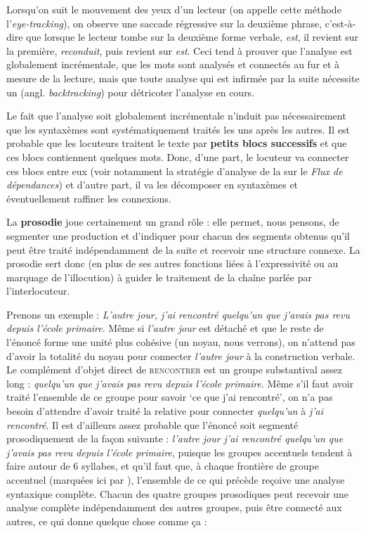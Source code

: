 {    Lorsqu’on suit le mouvement des yeux d’un lecteur (on appelle cette méthode l’\textit{eye-tracking}), on observe une saccade régressive sur la deuxième phrase, c’est-à-dire que lorsque le lecteur tombe sur la deuxième forme verbale, \textit{est}, il revient sur la première, \textit{reconduit}, puis revient sur \textit{est}. Ceci tend à prouver que l’analyse est globalement incrémentale, que les mots sont analysés et connectés au fur et à mesure de la lecture, mais que toute analyse qui est infirmée par la suite nécessite un  (angl. \textit{backtracking}) pour détricoter l’analyse en cours.

    Le fait que l’analyse soit globalement incrémentale n’induit pas nécessairement que les syntaxèmes sont systématiquement traités les uns après les autres. Il est probable que les locuteurs traitent le texte par \textbf{petits blocs successifs} et que ces blocs contiennent quelques mots. Donc, d’une part, le locuteur va connecter ces blocs entre eux (voir notamment la stratégie d’analyse de la  sur le \textit{Flux de dépendances}) et d’autre part, il va les décomposer en syntaxèmes et éventuellement raffiner les connexions.

    La \textbf{prosodie} joue certainement un grand rôle : elle permet, nous pensons, de segmenter une production et d’indiquer pour chacun des segments obtenus qu’il peut être traité indépendamment de la suite et recevoir une structure connexe. La prosodie sert donc (en plus de ses autres fonctions liées à l’expressivité ou au marquage de l’illocution) à guider le traitement de la chaîne parlée par l’interlocuteur.

    Prenons un exemple : \textit{L’autre jour, j’ai rencontré quelqu’un que j’avais pas revu depuis l’école primaire}. Même si \textit{l’autre jour} est détaché et que le reste de l’énoncé forme une unité plus cohésive (un noyau, nous verrons), on n’attend pas d’avoir la totalité du noyau pour connecter \textit{l’autre jour} à la construction verbale. Le complément d’objet direct de \textsc{rencontrer} est un groupe substantival assez long : \textit{quelqu’un que j’avais pas revu depuis l’école primaire}. Même s’il faut avoir traité l’ensemble de ce groupe pour savoir ‘ce que j’ai rencontré’, on n’a pas besoin d’attendre d’avoir traité la relative pour connecter \textit{quelqu’un} à \textit{j’ai rencontré}. Il est d’ailleurs assez probable que l’énoncé soit segmenté prosodiquement de la façon suivante : \textit{l’autre jour {\textbar} j’ai rencontré quelqu’un {\textbar} que j’avais pas revu {\textbar} depuis l’école primaire}, puisque les groupes accentuels tendent à faire autour de 6 syllabes, et qu’il faut que, à chaque frontière de groupe accentuel (marquées ici par {\textbar} ), l’ensemble de ce qui précède reçoive une analyse syntaxique complète. Chacun des quatre groupes prosodiques peut recevoir une analyse complète indépendamment des autres groupes, puis être connecté aux autres, ce qui donne quelque chose comme ça :

}
